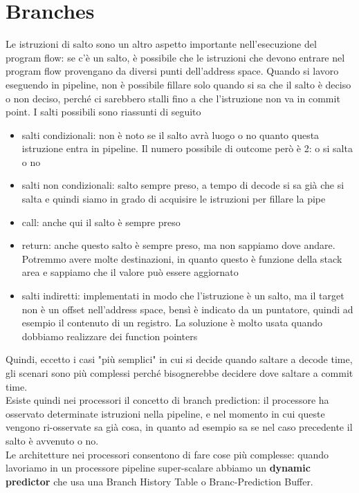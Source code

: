 \documentclass[12pt, oneside]{extbook}
\begin{document}
\section{Branches}
Le istruzioni di salto sono un altro aspetto importante nell'esecuzione del program flow: se c'è un salto, è possibile che le istruzioni che devono entrare nel program flow provengano da diversi punti dell'address space. Quando si lavoro eseguendo in pipeline, non è possibile fillare solo quando si sa che il salto è deciso o non deciso, perché ci sarebbero stalli fino a che l'istruzione non va in commit point. I salti possibili sono riassunti di seguito 
\begin{itemize}
\item salti condizionali: non è noto se il salto avrà luogo o no quanto questa istruzione entra in pipeline. Il numero possibile di outcome però è 2: o si salta o no
\item salti non condizionali: salto sempre preso, a tempo di decode si sa già che si salta e quindi siamo in grado di acquisire le istruzioni per fillare la pipe 
\item call: anche qui il salto è sempre preso
\item return: anche questo salto è sempre preso, ma non sappiamo dove andare. Potremmo avere molte destinazioni, in quanto questo è funzione della stack area e sappiamo che il valore può essere aggiornato
\item salti indiretti: implementati in modo che l'istruzione è un salto, ma il target non è un offset nell'address space, bensì è indicato da un puntatore, quindi ad esempio il contenuto di un registro. La soluzione è molto usata quando dobbiamo realizzare dei function pointers
\end{itemize}
Quindi, eccetto i casi "più semplici" in cui si decide quando saltare a decode time, gli scenari sono più complessi perché bisognerebbe decidere dove saltare a commit time.\\ Esiste quindi nei processori il concetto di branch prediction: il processore ha osservato determinate istruzioni nella pipeline, e nel momento in cui queste vengono ri-osservate sa già cosa, in quanto ad esempio sa se nel caso precedente il salto è avvenuto o no.\\ Le architetture nei processori consentono di fare cose più complesse: quando lavoriamo in un processore pipeline super-scalare abbiamo un \textbf{dynamic predictor} che usa una Branch History Table o Branc-Prediction Buffer.\\ 
\end{document}
